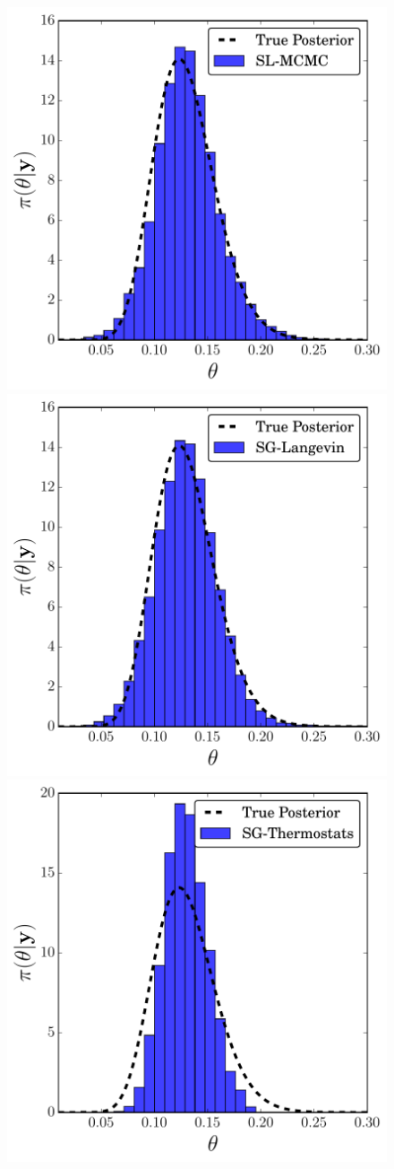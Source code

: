 \documentclass[]{article}
\begin{document}
\begin{figure}[t]
\vskip 0.2in
\begin{center}
\includegraphics[width=0.32\columnwidth]{./images/exp-SL-MCMC-posterior-hist-omega-rate-100p0-chain0.pdf}
\includegraphics[width=0.32\columnwidth]{./images/exp-SG-Langevin-posterior-hist-omega-rate-100p0-chain0.pdf}
\includegraphics[width=0.32\columnwidth]{./images/exp-SG-Thermostats-posterior-hist-omega-rate-100p0-chain0.pdf}


\end{center}
\end{figure}
\end{document}
